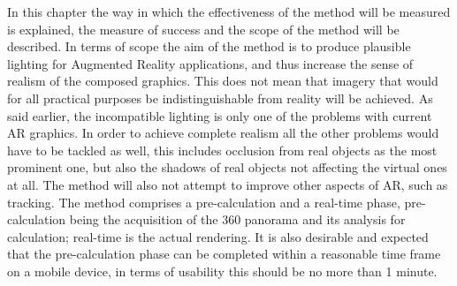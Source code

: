 
In this chapter the way in which the effectiveness of the method will be measured is explained, the measure of success and the scope of the method will be described. In terms of scope the aim of the method is to produce plausible lighting for Augmented Reality applications, and thus increase the sense of realism of the composed graphics. This does not mean that imagery that would for all practical purposes be indistinguishable from reality will be achieved. As said earlier, the incompatible lighting is only one of the problems with current AR graphics. In order to achieve complete realism all the other problems would have to be tackled as well, this includes occlusion from real objects as the most prominent one, but also the shadows of real objects not affecting the virtual ones at all. The method will also not attempt to improve other aspects of AR, such as tracking. The method comprises a pre-calculation and a real-time phase, pre-calculation being the acquisition of the 360 panorama and its analysis for calculation; real-time is the actual rendering. It is also desirable and expected that the pre-calculation phase can be completed within a reasonable time frame on a mobile device, in terms of usability this should be no more than 1 minute.\newline
